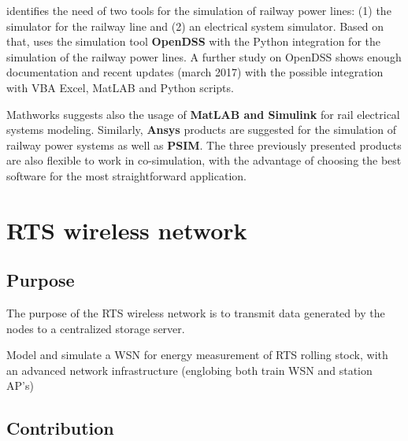 \cite{pilo2000} identifies the need of two tools for the simulation of railway power lines: (1) the simulator for the railway line and (2) an electrical system simulator. Based on that, \cite{almagro2017} uses the simulation tool \textbf{OpenDSS} with the Python integration for the simulation of the railway power lines. A further study on OpenDSS shows enough documentation and recent updates (march 2017) with the possible integration with VBA Excel, MatLAB and Python scripts.

Mathworks suggests also the usage of \textbf{MatLAB and Simulink} for rail electrical systems modeling. 
Similarly, \textbf{Ansys} products are suggested for the simulation of railway power systems as well as \textbf{PSIM}. The three previously presented products are also flexible to work in co-simulation, with the advantage of choosing the best software for the most straightforward application.


\section{RTS wireless network}
\label{sec:43}

\subsection{Purpose}

The purpose of the RTS wireless network is to transmit data generated by the nodes to a centralized storage server. 

Model and simulate a WSN for energy measurement of RTS rolling stock, with an advanced network infrastructure (englobing both train WSN and station AP’s)

\subsection{Contribution}

